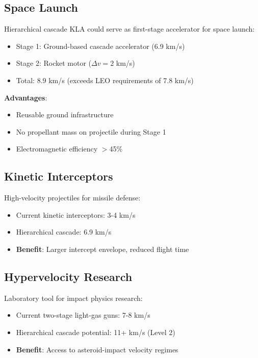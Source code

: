 \documentclass[12pt,a4paper]{article}
\begin{document}
\subsection{Space Launch}

Hierarchical cascade KLA could serve as first-stage accelerator for space launch:

\begin{itemize}
\item Stage 1: Ground-based cascade accelerator (6.9 km/s)
\item Stage 2: Rocket motor ($\Delta v = 2$ km/s)
\item Total: 8.9 km/s (exceeds LEO requirements of 7.8 km/s)
\end{itemize}

\textbf{Advantages}:
\begin{itemize}
\item Reusable ground infrastructure
\item No propellant mass on projectile during Stage 1
\item Electromagnetic efficiency $>$45\%
\end{itemize}

\subsection{Kinetic Interceptors}

High-velocity projectiles for missile defense:

\begin{itemize}
\item Current kinetic interceptors: 3-4 km/s
\item Hierarchical cascade: 6.9 km/s
\item \textbf{Benefit}: Larger intercept envelope, reduced flight time
\end{itemize}

\subsection{Hypervelocity Research}

Laboratory tool for impact physics research:

\begin{itemize}
\item Current two-stage light-gas guns: 7-8 km/s
\item Hierarchical cascade potential: 11+ km/s (Level 2)
\item \textbf{Benefit}: Access to asteroid-impact velocity regimes
\end{itemize}
\end{document}
